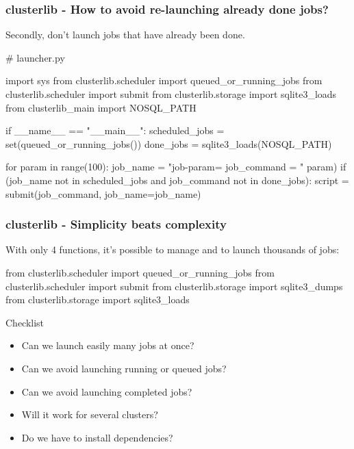 \documentclass[11pt,compress,serif]{beamer}
\begin{document}
\begin{frame}[fragile=singleslide]
\frametitle{clusterlib - How to avoid re-launching already done jobs?}

Secondly, don't launch jobs that have already been done.

\begin{pythoncode}
# launcher.py

import sys
from clusterlib.scheduler import queued_or_running_jobs
from clusterlib.scheduler import submit
from clusterlib.storage import sqlite3_loads
from clusterlib_main import NOSQL_PATH

if __name__ == "__main__":
    scheduled_jobs = set(queued_or_running_jobs())
    done_jobs = sqlite3_loads(NOSQL_PATH)
    
    for param in range(100):
        job_name = "job-param=%
        job_command = "%
                                                 param)
        if (job_name not in scheduled_jobs and 
                job_command not in done_jobs):
            script = submit(job_command, job_name=job_name)
\end{pythoncode}
    
\end{frame}

\begin{frame}[fragile=singleslide]
\frametitle{clusterlib - Simplicity beats complexity}


With only 4 functions, it's possible to manage and to launch thousands of jobs:

\begin{pythoncode}
from clusterlib.scheduler import queued_or_running_jobs
from clusterlib.scheduler import submit 
from clusterlib.storage import sqlite3_dumps
from clusterlib.storage import sqlite3_loads
\end{pythoncode}


\begin{block}{Checklist}
\begin{itemize}
    \item Can we launch easily many jobs at once? 
    \item Can we avoid launching running or queued jobs? 
    \item Can we avoid launching completed jobs? 
    \item Will it work for several clusters? 
    \item Do we have to install dependencies? 
\end{itemize}    
\end{block}

\end{frame}
\end{document}

